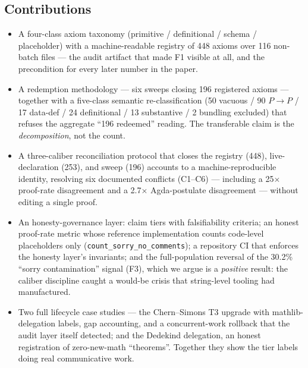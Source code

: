 \subsection{Contributions}
\label{sec:contributions}
\begin{itemize}
\item[\textbf{C1}] A four-class axiom taxonomy (primitive /
definitional / schema / placeholder) with a machine-readable registry
of 448 axioms over 116 non-batch files --- the audit artifact that
made F1 visible at all, and the precondition for every later number
in the paper.
\item[\textbf{C2}] A redemption methodology --- six sweeps closing
196 registered axioms --- together with a five-class semantic
re-classification (50 vacuous / 90 $P\!\to\!P$ / 17 data-def / 24
definitional / 13 substantive / 2 bundling excluded) that refuses the
aggregate ``196 redeemed'' reading. The transferable claim is the
\emph{decomposition}, not the count.
\item[\textbf{C3}] A three-caliber reconciliation protocol that
closes the registry (448), live-declaration (253), and sweep (196)
accounts to a machine-reproducible identity, resolving six
documented conflicts (C1--C6) --- including a 25$\times$
proof-rate disagreement and a 2.7$\times$ Agda-postulate
disagreement --- without editing a single proof.
\item[\textbf{C4}] An honesty-governance layer: claim tiers with
falsifiability criteria; an honest proof-rate metric whose reference
implementation counts code-level placeholders only
(\texttt{count\_\allowbreak sorry\_\allowbreak no\_\allowbreak comments}); a repository CI that enforces
the honesty layer's invariants; and the full-population reversal of
the 30.2\% ``sorry contamination'' signal (F3), which we argue is a
\emph{positive} result: the caliber discipline caught a would-be
crisis that string-level tooling had manufactured.
\item[\textbf{C5}] Two full lifecycle case studies --- the
Chern--Simons T3 upgrade with mathlib-delegation labels, gap
accounting, and a concurrent-work rollback that the audit layer
itself detected; and the Dedekind delegation, an honest registration
of zero-new-math ``theorems''. Together they show the tier labels
doing real communicative work.
\end{itemize}

